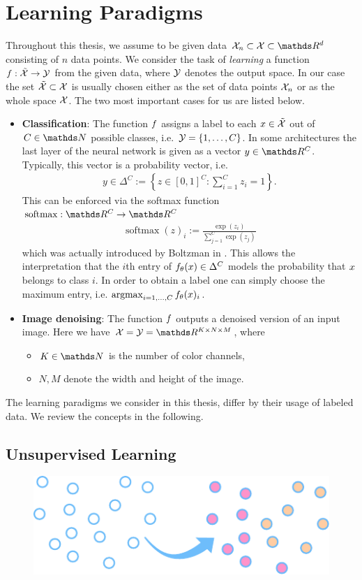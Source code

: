 \chapter{Learning Paradigms}\label{ch:para}

Throughout this thesis, we assume to be given data $\Inp_n\subset\Inp\subset \R^d$ consisting of $n$ data points. We consider the task of \emph{learning} a function $f:\tilde{\mathcal{X}}\to \mathcal{\mathcal{Y}}$ from the given data, where $\mathcal{\mathcal{Y}}$ denotes the output space. In our case the set $\tilde{\mathcal{X}}\subset\mathcal{X}$ is usually chosen either as the set of data points $\mathcal{X}_n$ or as the whole space $\mathcal{X}$. The two most important cases for us are listed below.
%
\begin{itemize}
\item \textbf{Classification}: The function $f$ assigns a label to each $x\in \tilde{\mathcal{X}}$ out of $C\in\N$ possible classes, i.e. $\mathcal{\mathcal{Y}}=\{1,\ldots,C\}$. In some architectures the last layer of the neural network is given as a vector $\oup\in\R^C$. Typically, this vector is a probability vector, i.e. 
%
\begin{align*}
y\in \Delta^C := \left\{z\in[0,1]^C: \sum_{i=1}^C z_i = 1\right\}.
\end{align*}
%
This can be enforced via the softmax function \cite{bridle1990probabilistic} $\operatorname{soft max}:\R^C\to\R^C$
%
\begin{align*}
\operatorname{soft max}(z)_i := \frac{\exp(z_i)}{\sum_{j=1}^C \exp(z_j)} 	
\end{align*}
%
which was actually introduced by Boltzman in \cite{boltzmann1868studien}. This allows the interpretation that the $i$th entry of $f_\theta(x)\in\Delta^C$ models the probability that $x$ belongs to class $i$. In order to obtain a label one can simply choose the maximum entry, i.e.  $\operatorname{argmax}_{i=1,\ldots,C} f_\theta(x)_i$.
%
\item \textbf{Image denoising}: The function $f$ outputs a denoised version of an input image. Here we have $\Inp = \Oup=\R^{K\times N\times M}$, where
%
\begin{itemize}
\item $K\in\N$ is the number of color channels,
\item $N,M$ denote the width and height of the image.
\end{itemize}
\end{itemize}
%
The learning paradigms we consider in this thesis, differ by their usage of labeled data. We review the concepts in the following.
%
\clearpage%
\section{Unsupervised Learning}
\begin{figure}
\centering
\includegraphics[width=.5\textwidth]{atelier/paradigms/UL.pdf}
\end{figure}

